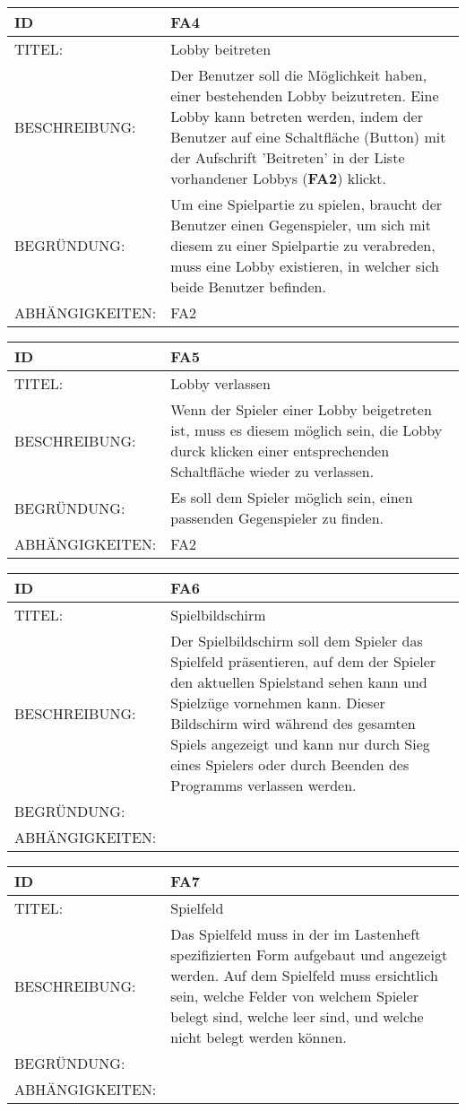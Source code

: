 \documentclass{uulm-assignment}
\begin{document}
\begin{tabularx}{16cm}{l|X}
\textbf{ID} & \textbf{FA4} \\
\hline
TITEL: & Lobby beitreten \\
\hline
BESCHREIBUNG: & Der Benutzer soll die Möglichkeit haben, einer bestehenden Lobby beizutreten.
Eine Lobby kann betreten werden, indem der Benutzer auf eine Schaltfläche (Button) mit der Aufschrift 'Beitreten' in der Liste vorhandener Lobbys (\textbf{FA2}) klickt.
\\
\hline
BEGRÜNDUNG: & Um eine Spielpartie zu spielen, braucht der Benutzer einen Gegenspieler, um sich mit diesem zu einer Spielpartie zu verabreden, muss eine Lobby existieren, in welcher sich beide Benutzer befinden. \\
\hline
ABHÄNGIGKEITEN: & FA2\\
\end{tabularx}

\begin{tabularx}{16cm}{l|X}
\textbf{ID} & \textbf{FA5} \\
\hline
TITEL: & Lobby verlassen \\
\hline
BESCHREIBUNG: & Wenn der Spieler einer Lobby beigetreten ist, muss es diesem möglich sein, die Lobby durck klicken einer entsprechenden Schaltfläche wieder zu verlassen.
\\
\hline
BEGRÜNDUNG: & Es soll dem Spieler möglich sein, einen passenden Gegenspieler zu finden.\\
\hline
ABHÄNGIGKEITEN: & FA2\\
\end{tabularx}

\begin{tabularx}{16cm}{l|X}
\textbf{ID} & \textbf{FA6} \\
\hline
TITEL: & Spielbildschirm \\
\hline
BESCHREIBUNG: & Der Spielbildschirm soll dem Spieler das Spielfeld präsentieren, auf dem der Spieler den aktuellen Spielstand sehen kann und Spielzüge vornehmen kann.
Dieser Bildschirm wird während des gesamten Spiels angezeigt und kann nur durch Sieg eines Spielers oder durch Beenden des Programms verlassen werden. 
\\
\hline
BEGRÜNDUNG: &\\
\hline
ABHÄNGIGKEITEN: & \\
\end{tabularx}

\begin{tabularx}{16cm}{l|X}
\textbf{ID} & \textbf{FA7} \\
\hline
TITEL: & Spielfeld \\
\hline
BESCHREIBUNG: & Das Spielfeld muss in der im Lastenheft spezifizierten Form aufgebaut und angezeigt werden.
Auf dem Spielfeld muss ersichtlich sein, welche Felder von welchem Spieler belegt sind, welche leer sind, und welche nicht belegt werden können.
\\
\hline
BEGRÜNDUNG: &\\
\hline
ABHÄNGIGKEITEN: & \\
\end{tabularx}
\end{document}
